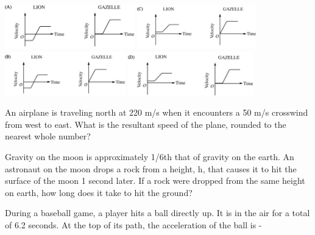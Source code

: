 \documentclass[10pt]{examdesign}
\begin{document}
\begin{multiplechoice} [title={Multiple Choice},
	rearrange=yes]
\begin{question}
	\includegraphics[height=0.75in]{lga.png} \hspace{1in} \includegraphics[height=0.75in]{lgc.png} \\	
	\includegraphics[height=0.75in]{lgb.png} \hspace{1in} \includegraphics[height=0.75in]{lgd.png}

\end{question}

\begin{question}
An airplane is traveling north at 220 m/s when it encounters a 50 m/s crosswind from west to east.  What is the resultant speed of the plane, rounded to the nearest whole number? 
	\end{question}




\begin{question}
Gravity on the moon is approximately 1/6th that of gravity on the earth.  An astronaut on the moon drops  a rock from a height, h, that causes it to hit the surface of the moon 1 second later. If a rock were dropped from the same height on earth, how long does it take to hit the ground?
	\end{question}

\begin{question}
	During a baseball game, a player hits a ball directly up.  It is in the air for a total of 6.2 seconds.  At the top of its path, the acceleration of the ball is - 
\end{question}


\end{multiplechoice}
\end{document}
